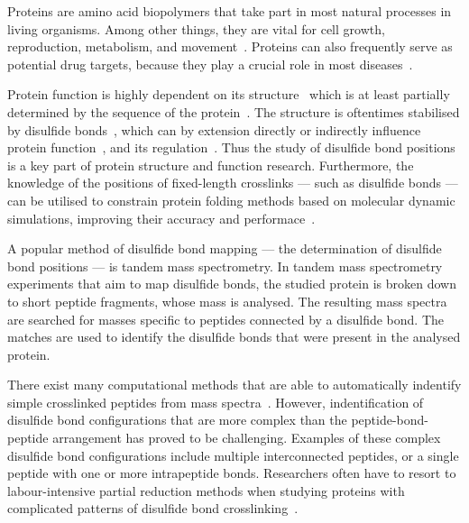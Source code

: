 

Proteins are amino acid biopolymers that take part in most natural processes in living organisms. Among other things, they are vital for cell growth, reproduction, metabolism, and movement~\cite{johnson1994sequential, prescott1968regulation, ketelaar2004actin, elston1998energy}. Proteins can also frequently serve as potential drug targets, because they play a crucial role in most diseases~\cite{konopatskaya2010protein, yamin2008amyloid}.

Protein function is highly dependent on its structure~\cite{orengo1999protein} which is at least partially determined by the sequence of the protein~\cite{anfinsen1973principles}. The structure is oftentimes stabilised by disulfide bonds~\cite{wedemeyer2000disulfide, mcauley2008contributions}, which can by extension directly or indirectly influence protein function~\cite{nagahara2011intermolecular}, and its regulation~\cite{chiu2019allosteric}. Thus the study of disulfide bond positions is a key part of protein structure and function research. Furthermore, the knowledge of the positions of fixed-length crosslinks --- such as disulfide bonds --- can be utilised to constrain protein folding methods based on molecular dynamic simulations, improving their accuracy and performace~\cite{brodie2017solving}.

A popular method of disulfide bond mapping --- the determination of disulfide bond positions --- is tandem mass spectrometry. In tandem mass spectrometry experiments that aim to map disulfide bonds, the studied protein is broken down to short peptide fragments, whose mass is analysed. The resulting mass spectra are searched for masses specific to peptides connected by a disulfide bond. The matches are used to identify the disulfide bonds that were present in the analysed protein.

There exist many computational methods that are able to automatically indentify simple crosslinked peptides from mass spectra~\cite{lakbub2018recent, liu2014facilitating}. However, indentification of disulfide bond configurations that are more complex than the peptide-bond-peptide arrangement has proved to be challenging. Examples of these complex disulfide bond configurations include multiple interconnected peptides, or a single peptide with one or more intrapeptide bonds. Researchers often have to resort to labour-intensive partial reduction methods when studying proteins with complicated patterns of disulfide bond crosslinking~\cite{wu1997novel, li2013disulfide}.

